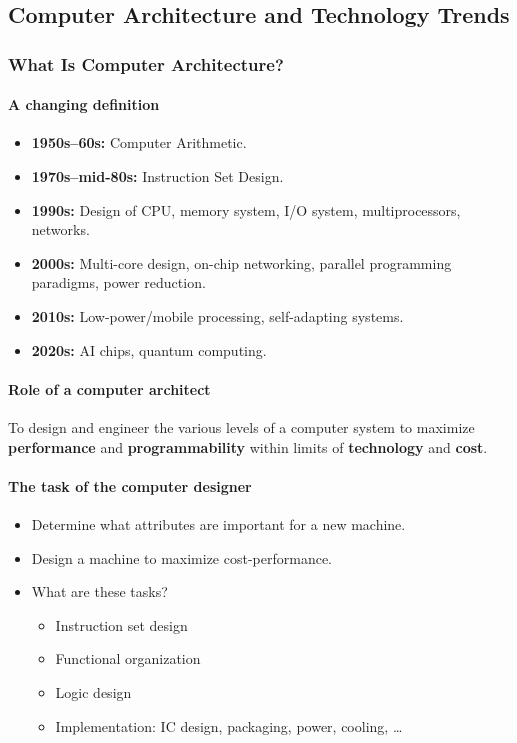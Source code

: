 \subsection{Computer Architecture and Technology Trends}
\label{sec:architecture}

\subsubsection{What Is Computer Architecture?}
\label{sec:what-is-architecture}

\paragraph{A changing definition}
\begin{itemize}
  \item \textbf{1950s--60s:} Computer Arithmetic.
  \item \textbf{1970s--mid-80s:} Instruction Set Design.
  \item \textbf{1990s:} Design of CPU, memory system, I/O system,
  multiprocessors, networks.
  \item \textbf{2000s:} Multi-core design, on-chip networking, parallel
  programming paradigms, power reduction.
  \item \textbf{2010s:} Low-power/mobile processing, self-adapting systems.
  \item \textbf{2020s:} AI chips, quantum computing.
\end{itemize}

\paragraph{Role of a computer architect}
\begin{definition}
To design and engineer the various levels of a computer system to
maximize \textbf{performance} and \textbf{programmability} within limits
of \textbf{technology} and \textbf{cost}.
\end{definition}

\paragraph{The task of the computer designer}
\begin{itemize}
  \item Determine what attributes are important for a new machine.
  \item Design a machine to maximize cost-performance.
  \item What are these tasks?
  \begin{itemize}
    \item Instruction set design
    \item Functional organization
    \item Logic design
    \item Implementation: IC design, packaging, power, cooling, \dots
  \end{itemize}
\end{itemize}

